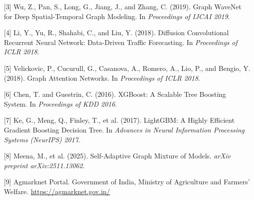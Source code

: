 \documentclass[12pt]{article}
\begin{document}
[3] Wu, Z., Pan, S., Long, G., Jiang, J., and Zhang, C. (2019). Graph WaveNet for Deep Spatial-Temporal Graph Modeling. In \textit{Proceedings of IJCAI 2019}.

[4] Li, Y., Yu, R., Shahabi, C., and Liu, Y. (2018). Diffusion Convolutional Recurrent Neural Network: Data-Driven Traffic Forecasting. In \textit{Proceedings of ICLR 2018}.

[5] Velickovic, P., Cucurull, G., Casanova, A., Romero, A., Lio, P., and Bengio, Y. (2018). Graph Attention Networks. In \textit{Proceedings of ICLR 2018}.

[6] Chen, T. and Guestrin, C. (2016). XGBoost: A Scalable Tree Boosting System. In \textit{Proceedings of KDD 2016}.

[7] Ke, G., Meng, Q., Finley, T., et al. (2017). LightGBM: A Highly Efficient Gradient Boosting Decision Tree. In \textit{Advances in Neural Information Processing Systems (NeurIPS) 2017}.

[8] Meena, M., et al. (2025). Self-Adaptive Graph Mixture of Models. \textit{arXiv preprint arXiv:2511.13062}.

[9] Agmarknet Portal. Government of India, Ministry of Agriculture and Farmers' Welfare. \url{https://agmarknet.gov.in/}
\end{document}
